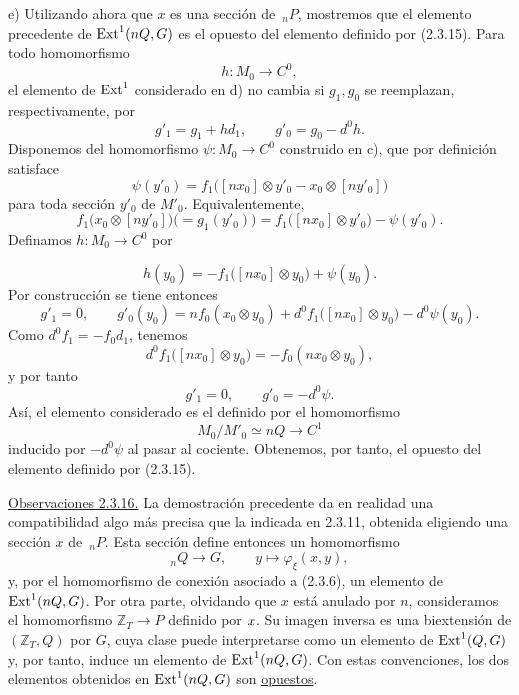 \medskip
\noindent e) Utilizando ahora que $x$ es una sección de $\,{}_nP$,
mostremos que el elemento precedente de $\Ext^1(nQ,G)$ es el opuesto
del elemento definido por (2.3.15). Para todo homomorfismo
\[
 h:M_0\longrightarrow C^0,
\]
el elemento de $\Ext^1$ considerado en d) no cambia si $g_1,g_0$ se
reemplazan, respectivamente, por
\[
 g'_1=g_1+h d_1,
 \qquad
 g'_0=g_0-d^0h.
\]
Disponemos del homomorfismo $\psi:M_0\longrightarrow C^0$ construido
en c), que por definición satisface
\[
 \psi(y'_0)=
 f_1\bigl([nx_0]\otimes y'_0-x_0\otimes[ny'_0]\bigr)
\]
para toda sección $y'_0$ de $M'_0$. Equivalentemente,
\[
 f_1\bigl(x_0\otimes[ny'_0]\bigr)
 \bigl(=g_1(y'_0)\bigr)
 =f_1\bigl([nx_0]\otimes y'_0\bigr)-\psi(y'_0).
\]
Definamos $h:M_0\longrightarrow C^0$ por


\[
 h(y_0)=-f_1\bigl([nx_0]\otimes y_0\bigr)+\psi(y_0).
\]
Por construcción se tiene entonces
\[
 g'_1=0,
 \qquad
 g'_0(y_0)=n f_0(x_0\otimes y_0)
 +d^0f_1\bigl([nx_0]\otimes y_0\bigr)-d^0\psi(y_0).
\]
Como $d^0f_1=-f_0d_1$, tenemos
\[
 d^0f_1\bigl([nx_0]\otimes y_0\bigr)
 =-f_0(nx_0\otimes y_0),
\]
y por tanto
\[
 g'_1=0,
 \qquad
 g'_0=-d^0\psi.
\]
Así, el elemento considerado es el definido por el homomorfismo
\[
 M_0/M'_0\simeq nQ\longrightarrow C^1
\]
inducido por $-d^0\psi$ al pasar al cociente. Obtenemos, por tanto, el
opuesto del elemento definido por (2.3.15).

\medskip
\noindent\underline{Observaciones 2.3.16.}
La demostración precedente da en realidad una compatibilidad algo más
precisa que la indicada en 2.3.11, obtenida eligiendo una sección $x$
de $\,{}_nP$. Esta sección define entonces un homomorfismo
\[
 {}_nQ\longrightarrow G,
 \qquad
 y\longmapsto\varphi_\xi(x,y),
\]
y, por el homomorfismo de conexión asociado a (2.3.6), un elemento de
$\Ext^1(nQ,G)$. Por otra parte, olvidando que $x$ está anulado por
$n$, consideramos el homomorfismo $\mathbb Z_T\longrightarrow P$
definido por $\sisi{X}{x}$. Su imagen inversa es una biextensión de
$(\mathbb Z_T,Q)$ por $G$, cuya clase puede interpretarse como un
elemento de $\Ext^1(Q,G)$ y, por tanto, induce un elemento de
$\Ext^1(nQ,G)$. Con estas convenciones, los dos elementos obtenidos
en $\Ext^1(nQ,G)$ son \underline{opuestos}.
